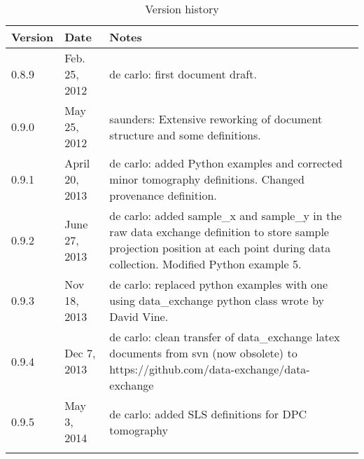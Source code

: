 
\begin{longtable}{p{1.2cm} p{2.6cm}  p{9.9cm}}
\caption{Version history} \\
\bfseries Version & \bfseries Date & \bfseries Notes \\ 
\endhead
\toprule
0.8.9 & Feb. 25, 2012 & de carlo: first document draft. \\
0.9.0 & May 25, 2012 & saunders: Extensive reworking of document structure and some definitions. \\
0.9.1 & April 20, 2013 & de carlo: added Python examples and corrected minor tomography definitions. Changed provenance definition.\\
0.9.2 & June 27, 2013 & de carlo: added sample\_x and sample\_y in the raw data exchange definition to store sample projection position at each point during data collection. Modified Python example 5.\\
0.9.3 & Nov 18, 2013 & de carlo: replaced python examples with one using data\_exchange python class wrote by David Vine.\\
0.9.4 & Dec 7, 2013 & de carlo: clean transfer of data\_exchange latex documents from svn (now obsolete) to https://github.com/data-exchange/data-exchange \\
0.9.5 & May 3, 2014 & de carlo: added SLS definitions for DPC tomography \\
\bottomrule
\label{table:SI}
\end{longtable}